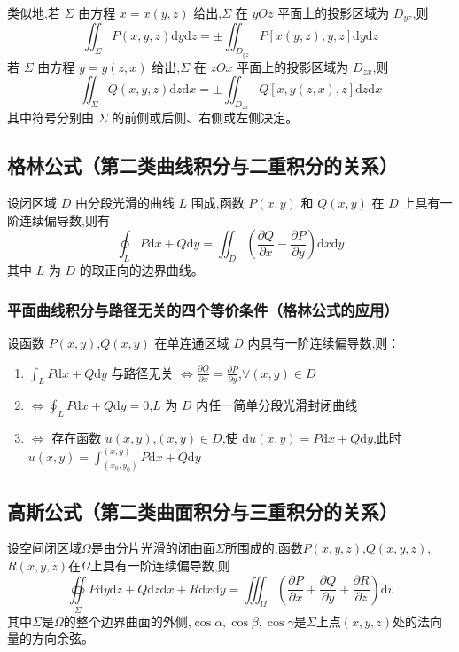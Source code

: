 \documentclass[UTF8]{ctexart}
\theoremstyle{remark}
\begin{document}
			类似地,若 \( \Sigma \) 由方程 \( x = x(y, z) \) 给出,\( \Sigma \) 在 \( yOz \) 平面上的投影区域为 \( D_{yz} \),则
			\[
			\iint_{\Sigma} P(x, y, z) \mathrm{d}y \mathrm{d}z = \pm \iint_{D_{yz}} P[x(y, z), y, z] \mathrm{d}y \mathrm{d}z
			\]
			若 \( \Sigma \) 由方程 \( y = y(z, x) \) 给出,\( \Sigma \) 在 \( zOx \) 平面上的投影区域为 \( D_{zx} \),则
			\[
			\iint_{\Sigma} Q(x, y, z) \mathrm{d}z \mathrm{d}x = \pm \iint_{D_{zx}} Q[x, y(z, x), z] \mathrm{d}z \mathrm{d}x
			\]
			其中符号分别由 \( \Sigma \) 的前侧或后侧、右侧或左侧决定。
			
			\subsection{格林公式（第二类曲线积分与二重积分的关系）}
			设闭区域 \( D \) 由分段光滑的曲线 \( L \) 围成,函数 \( P(x, y) \) 和 \( Q(x, y) \) 在 \( D \) 上具有一阶连续偏导数,则有
			\[ \oint_{L} P \mathrm{d}x + Q \mathrm{d}y = \iint_{D} \left( \frac{\partial Q}{\partial x} - \frac{\partial P}{\partial y} \right) \mathrm{d}x \mathrm{d}y \]
			其中 \( L \) 为 \( D \) 的取正向的边界曲线。
			
			\subsubsection{平面曲线积分与路径无关的四个等价条件（格林公式的应用）}
			设函数 \( P(x, y) \),\( Q(x, y) \) 在单连通区域 \( D \) 内具有一阶连续偏导数,则：
			\begin{enumerate}
				\item \( \int_{L} P \mathrm{d}x + Q \mathrm{d}y \) 与路径无关 \( \Leftrightarrow \frac{\partial Q}{\partial x} = \frac{\partial P}{\partial y} \),\( \forall (x, y) \in D \)
				\item \( \Leftrightarrow \oint_{L} P \mathrm{d}x + Q \mathrm{d}y = 0 \),\( L \) 为 \( D \) 内任一简单分段光滑封闭曲线
				\item \( \Leftrightarrow \) 存在函数 \( u(x, y) \),\( (x, y) \in D \),使 \( \mathrm{d}u(x, y) = P \mathrm{d}x + Q \mathrm{d}y \),此时 \( u(x, y) = \int_{(x_0, y_0)}^{(x, y)} P \mathrm{d}x + Q \mathrm{d}y \)
			\end{enumerate}
	
	\subsection{高斯公式（第二类曲面积分与三重积分的关系）}
	设空间闭区域\(\Omega\)是由分片光滑的闭曲面\(\Sigma\)所围成的,函数\(P(x,y,z)\),\(Q(x,y,z)\),\(R(x,y,z)\)在\(\Omega\)上具有一阶连续偏导数,则
	\[
	\underset{\Sigma}{ \oiint } P \mathrm{d}y \mathrm{d}z + Q \mathrm{d}z \mathrm{d}x + R \mathrm{d}x \mathrm{d}y = \iiint_{\Omega} \left( \frac{\partial P}{\partial x} + \frac{\partial Q}{\partial y} + \frac{\partial R}{\partial z} \right) \mathrm{d}v
	\]
	其中\(\Sigma\)是\(\Omega\)的整个边界曲面的外侧,\(\cos\alpha,\cos\beta,\cos\gamma\)是\(\Sigma\)上点\((x,y,z)\)处的法向量的方向余弦。
	
\end{document}
